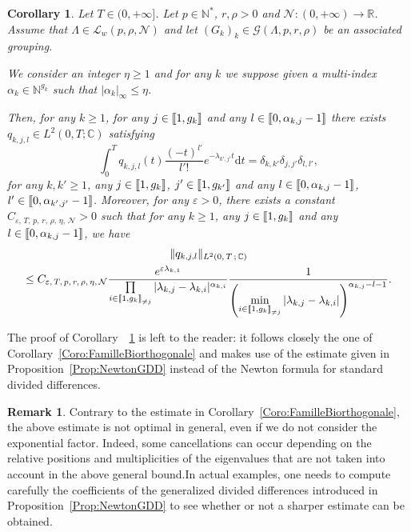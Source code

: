 \documentclass[11pt]{article}
\newtheorem{coro}[theo]{Corollary}
\theoremstyle{definition}
\newtheorem{rema}[theo]{Remark}
\numberwithin{equation}{section}
\numberwithin{figure}{section}
\numberwithin{table}{section}
\newcommand{\llbracket}{\mathopen{[\mkern -2.7mu[}}
\newcommand{\rrbracket}{\mathclose{]\mkern -2.7mu]}}
\newcommand{\inter}[2]{\llbracket #1,#2 \rrbracket}
\newcommand{\interexclu}[3]{\llbracket #1,#2\rrbracket_{\neq #3}}
\newcommand{\n}{g}
\newcommand{\LL}{\mathcal{L}}
\newcommand{\NN}{\mathcal{N}}
\newcommand{\N}{\mathbb{N}}
\newcommand{\R}{\mathbb{R}}
\newcommand{\C}{\mathbb{C}}
\newcommand{\md}{\mathrm{d}}
\begin{document}
\begin{coro} \label{Coro:FamilleBiorthogonaleAlg}
Let $T \in (0,+\infty]$. Let $p \in \N^*$, $r, \rho > 0$ and $\NN : (0,+\infty) \to \R$. Assume that $\Lambda \in \LL_w(p,\rho, \NN)$ and let $(G_k)_k\in \mathcal{G}(\Lambda,p,r,\rho)$ be an associated grouping.

We consider an integer $\eta \geq 1$ and for any $k$ we suppose given a multi-index $\alpha_k\in \N^{\n_k}$ such that $|\alpha_k|_\infty\leq \eta$.

Then, for any $k \geq 1$, for any $j \in \inter{1}{\n_k}$ and any $l \in \inter{0}{\alpha_{k,j}-1}$ there exists $q_{k,j,l} \in L^2(0,T ; \C)$ satisfying
\begin{equation*}\label{Famille_Biortho_Alg}
\int_0^T q_{k,j,l}(t) \frac{(-t)^{l'}}{l'!} e^{-\lambda_{k',j'} t } \md t = \delta_{k,k'} \delta_{j,j'} \delta_{l,l'},
\end{equation*}
for any $k, k' \geq 1$, any $j \in \inter{1}{\n_{k}}$, $j' \in \inter{1}{\n_{k'}}$ and any $l \in \inter{0}{\alpha_{k,j}-1}$, $l' \in \inter{0}{\alpha_{k',j'}-1}$. Moreover, for any $\varepsilon > 0$, there exists a constant $C_{\varepsilon,\,T,\, p,\, r,\, \rho,\, \eta,\,\NN} >0$ such that for any $k \geq 1$, any $j \in \inter{1}{\n_k}$ and any $l \in \inter{0}{\alpha_{k,j}-1}$, we have
\begin{multline*}\label{Estimee_Famille_Biortho_Alg}
\| q_{k,j,l} \|_{L^2(0,\,T\,;\,\C)} \\ \leq C_{\varepsilon,\,T, \,p,\, r,\, \rho,\, \eta,\, \NN} \frac{e^{\varepsilon \lambda_{k,1}}}{ \prod\limits_{i \in \interexclu{1}{\n_k}{j}} |\lambda_{k,j} - \lambda_{k,i}|^{\alpha_{k,i}}} \frac{1}{\left(\min\limits_{i\in\interexclu{1}{\n_k}{j}} |\lambda_{k,j}-\lambda_{k,i}|\right)^{\alpha_{k,j}-l-1}}.
\end{multline*}
\end{coro}


The proof of Corollary~~\ref{Coro:FamilleBiorthogonaleAlg} is left to the reader: it follows closely the one of Corollary~\ref{Coro:FamilleBiorthogonale} and makes use of the estimate given in Proposition~\ref{Prop:NewtonGDD} instead of the Newton formula for standard divided differences.

\begin{rema}
Contrary to the estimate in Corollary~\ref{Coro:FamilleBiorthogonale}, the above estimate is not optimal in general, even if we do not consider the exponential factor. Indeed, some cancellations can occur depending on the relative positions and multiplicities of the eigenvalues that are not taken into account in the above general bound.\linebreak In actual examples, one needs to compute carefully the coefficients of the generalized divided differences introduced in Proposition~\ref{Prop:NewtonGDD} to see whether or not a sharper estimate can be obtained.
\end{rema}
\end{document}
